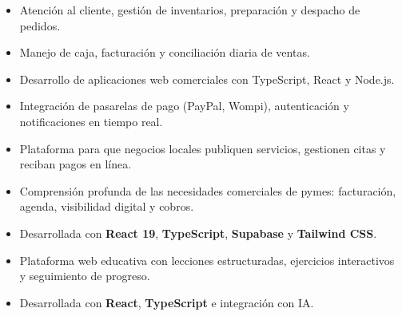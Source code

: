 \documentclass[11pt, a4paper]{awesome-cv}
\begin{document}
\begin{itemize}
  \item Atención al cliente, gestión de inventarios, preparación y despacho de pedidos.
  \item Manejo de caja, facturación y conciliación diaria de ventas.
\end{itemize}

\begin{itemize}
  \item Desarrollo de aplicaciones web comerciales con TypeScript, React y Node.js.
  \item Integración de pasarelas de pago (PayPal, Wompi), autenticación y notificaciones en tiempo real.
\end{itemize}


\divider

\begin{itemize}
  \item Plataforma para que negocios locales publiquen servicios, gestionen citas y reciban pagos en línea.
  \item Comprensión profunda de las necesidades comerciales de pymes: facturación, agenda, visibilidad digital y cobros.
  \item Desarrollada con \textbf{React 19}, \textbf{TypeScript}, \textbf{Supabase} y \textbf{Tailwind CSS}.
\end{itemize}

\divider

\begin{itemize}
  \item Plataforma web educativa con lecciones estructuradas, ejercicios interactivos y seguimiento de progreso.
  \item Desarrollada con \textbf{React}, \textbf{TypeScript} e integración con IA.
\end{itemize}
\end{document}
